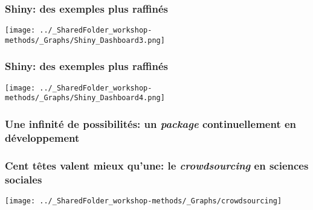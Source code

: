 \documentclass{beamer}
\begin{document}
    

    \begin{frame}
    
      \frametitle{Shiny: des exemples plus raffinés} \vspace{1cm}
      
        \begin{center}
      	  \texttt{[image: ../\_SharedFolder\_workshop-methods/\_Graphs/Shiny\_Dashboard3.png]}
        \end{center} 
      
          
    \end{frame}  
    
    

    \begin{frame}
    
      \frametitle{Shiny: des exemples plus raffinés} \vspace{1cm}
      
        \begin{center}
      	  \texttt{[image: ../\_SharedFolder\_workshop-methods/\_Graphs/Shiny\_Dashboard4.png]}
        \end{center} 
      
          
    \end{frame}  
    


    \begin{frame}
    
        \frametitle{Une infinité de possibilités: un \emph{package} continuellement en développement} \vspace{1cm}
    
    \end{frame}
    
    
    
     \begin{frame}
	        \frametitle{Cent têtes valent mieux qu’une: le \emph{crowdsourcing} en sciences sociales} \vspace{1cm}   
	        \begin{center}
	           \texttt{[image: ../\_SharedFolder\_workshop-methods/\_Graphs/crowdsourcing]}
	        \end{center}  
	    \end{frame}
    
   
\end{document}
